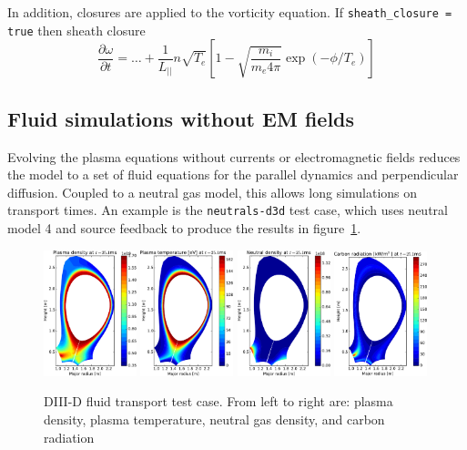 \documentclass[12pt,a4paper]{article}
\newcommand{\deriv}[2]{\frac{\partial #1}{\partial #2}}
\begin{document}
In addition, closures are applied to the vorticity equation. If \texttt{sheath\_closure = true} then sheath closure
\[
\deriv{\omega}{t} = \ldots + \frac{1}{L_{||}} n\sqrt{T_e}\left[1 - \sqrt{\frac{m_i}{m_e4\pi}}\exp\left(-\phi/T_e\right)\right]
\]


\subsection{Fluid simulations without EM fields}

Evolving the plasma equations without currents or electromagnetic fields reduces the model
to a set of fluid equations for the parallel dynamics and perpendicular diffusion. Coupled
to a neutral gas model, this allows long simulations on transport times. An example
is the \texttt{neutrals-d3d} test case, which uses neutral model 4 and source
feedback to produce the results in figure~\ref{fig:neutrals-d3d}.
\begin{figure}[h]
\centering
\includegraphics[width=0.24\textwidth]{figs/DIII-D/plasma_density.pdf}
\includegraphics[width=0.24\textwidth]{figs/DIII-D/plasma_temperature.pdf}
\includegraphics[width=0.24\textwidth]{figs/DIII-D/neutral_density.pdf}
\includegraphics[width=0.24\textwidth]{figs/DIII-D/carbon_radiation.pdf}
\caption{DIII-D fluid transport test case. From left to right are: plasma density, plasma temperature, neutral gas density, and carbon radiation}
\label{fig:neutrals-d3d}
\end{figure}
\end{document}
